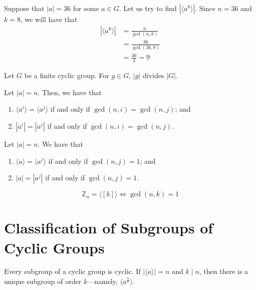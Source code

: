\begin{nexample}
    Suppose that \(|a| = 36\) for some \(a \in G\). Let us try to find \(\left|\langle a^8 \rangle\right|\). Since \(n = 36\) and \(k = 8\), we will have that
    \[
    \begin{aligned}
        \left|\langle a^8 \rangle\right|
            &= \frac{n}{\gcd(n, k)} \\
            &= \frac{36}{\gcd(36, 8)} \\
            &= \frac{36}{4} = 9
    \end{aligned}
    \]
\end{nexample}

\begin{corollary}
    Let \(G\) be a finite cyclic group. For \(g \in G\), \(|g|\) divides \(|G|\).
\end{corollary}

\begin{corollary}
    Let \(|a| = n\). Then, we have that
    \begin{enumerate}
        \item \(\langle a^i \rangle = \langle a^j \rangle\) if and only if \(\gcd(n, i) = \gcd(n, j)\); and
        \item \(\left|a^i\right| = \left|a^j\right|\) if and only if \(\gcd(n, i) = \gcd(n, j)\).
    \end{enumerate}
\end{corollary}

\begin{corollary}
    Let \(|a| = n\). We have that
    \begin{enumerate}
        \item \(\langle a \rangle = \langle a^j \rangle\) if and only if \(\gcd(n, j) = 1\); and
        \item \(|a| = |a^j|\) if and only if \(\gcd(n, j) = 1\).
    \end{enumerate}
\end{corollary}

\begin{corollary}
    \[
        \mathbb{Z}_n = \langle [k] \rangle \iff \gcd(n, k) = 1
    \]
\end{corollary}

\section{Classification of Subgroups of Cyclic Groups}

\begin{theorem}
    Every subgroup of a cyclic group is cyclic. If \(\left|\langle a \rangle\right| = n\) and \(k \mid n\), then there is a unique subgroup of order \(k\)---namely, \(\langle a^{\frac{n}{k}} \rangle\).
\end{theorem}

